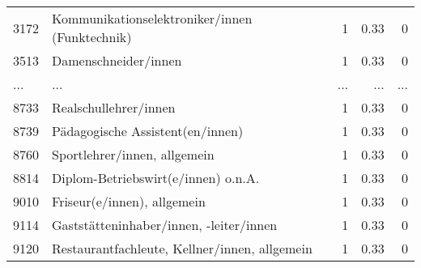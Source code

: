 \begin{longtable}{lXrrr}
        3172 & \multicolumn{1}{X}{Kommunikationselektroniker/innen (Funktechnik)} & %
          \num{1} &
          \num[round-mode=places,round-precision=2]{0.33} &
          \num[round-mode=places,round-precision=2]{0} \\
        3513 & \multicolumn{1}{X}{Damenschneider/innen} & %
          \num{1} &
          \num[round-mode=places,round-precision=2]{0.33} &
          \num[round-mode=places,round-precision=2]{0} \\
       ... & ... & ... & ... & ... \\
        8733 & \multicolumn{1}{X}{Realschullehrer/innen} & %
          \num{1} &
          \num[round-mode=places,round-precision=2]{0.33} &
          \num[round-mode=places,round-precision=2]{0} \\

        8739 & \multicolumn{1}{X}{Pädagogische Assistent(en/innen)} & %
          \num{1} &
          \num[round-mode=places,round-precision=2]{0.33} &
          \num[round-mode=places,round-precision=2]{0} \\

        8760 & \multicolumn{1}{X}{Sportlehrer/innen, allgemein} & %
          \num{1} &
          \num[round-mode=places,round-precision=2]{0.33} &
          \num[round-mode=places,round-precision=2]{0} \\

        8814 & \multicolumn{1}{X}{Diplom-Betriebswirt(e/innen) o.n.A.} & %
          \num{1} &
          \num[round-mode=places,round-precision=2]{0.33} &
          \num[round-mode=places,round-precision=2]{0} \\

        9010 & \multicolumn{1}{X}{Friseur(e/innen), allgemein} & %
          \num{1} &
          \num[round-mode=places,round-precision=2]{0.33} &
          \num[round-mode=places,round-precision=2]{0} \\

        9114 & \multicolumn{1}{X}{Gaststätteninhaber/innen, -leiter/innen} & %
          \num{1} &
          \num[round-mode=places,round-precision=2]{0.33} &
          \num[round-mode=places,round-precision=2]{0} \\

        9120 & \multicolumn{1}{X}{Restaurantfachleute, Kellner/innen, allgemein} & %
          \num{1} &
          \num[round-mode=places,round-precision=2]{0.33} &
          \num[round-mode=places,round-precision=2]{0} \\


\end{longtable}
